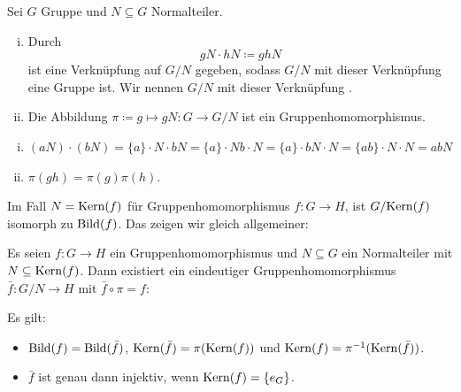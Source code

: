 \begin{definition}
  Sei \(G\) Gruppe und \(N\subseteq G\) Normalteiler.
  \begin{enumerate}[(i)]
  \item Durch
    \[
    gN\cdot hN\coloneq ghN
    \]
    ist eine Verknüpfung auf \(G/N\) gegeben,
    sodass \(G/N\) mit dieser Verknüpfung eine Gruppe ist.
    Wir nennen \(G/N\) mit dieser Verknüpfung .
  \item Die Abbildung \(\pi\coloneq g\mapsto gN:G\to G/N\) ist ein Gruppenhomomorphismus.
  \end{enumerate}
\end{definition}

\begin{beweis}
  \begin{enumerate}[(i)]
  \item \((aN) \cdot (bN)=\{a\}\cdot N\cdot bN=\{a\}\cdot Nb \cdot N=\{a\}\cdot bN \cdot N=\{ab\}\cdot N \cdot N=abN\)
  \item \(\pi(gh)=\pi(g)\pi(h)\).
  \end{enumerate}
\end{beweis}

  Im Fall \(N=\mathrm{Kern}(f)\) für Gruppenhomomorphismus \(f:G\to H\), ist \(G/\mathrm{Kern}(f)\) isomorph zu \(\mathrm{Bild}(f)\).
Das zeigen wir gleich allgemeiner:

\begin{satz}[Homomorphiesatz]
  \label{homomorphiesatz}
  Es seien \(f:G\to H\) ein Gruppenhomomorphismus und \(N\subseteq G\) ein Normalteiler mit \(N\subseteq \mathrm{Kern}(f)\).
  Dann existiert ein eindeutiger Gruppenhomomorphismus \(\bar{f}:G/N\to H\)
  mit \(\bar{f}\circ\pi=f\):
  \begin{center}
  \end{center}
  Es gilt:
  \begin{itemize}
  \item \(\mathrm{Bild}(f)=\mathrm{Bild}(\bar{f})\), \(\mathrm{Kern}(\bar{f})=\pi(\mathrm{Kern}(f))\)
    und \(\mathrm{Kern}(f)=\pi^{-1}(\mathrm{Kern}(\bar{f}))\).
  \item \(\bar{f}\) ist genau dann injektiv, wenn \(\mathrm{Kern}(f)=\{e_G\}\).
  \end{itemize}
\end{satz}


